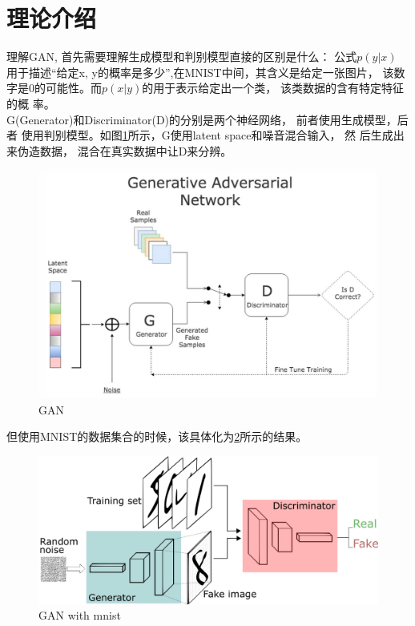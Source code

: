 \section{理论介绍}
理解GAN, 首先需要理解生成模型和判别模型直接的区别是什么：
公式$p(y|x)$ 用于描述“给定x, y的概率是多少”,在MNIST中间，其含义是给定一张图片，
该数字是0的可能性。而$p(x|y)$的用于表示给定出一个类， 该类数据的含有特定特征的概
率。\\
G(Generator)和Discriminator(D)的分别是两个神经网络， 前者使用生成模型，后者
使用判别模型。如图\ref{algorithm}所示，G使用latent space和噪音混合输入， 然
后生成出来伪造数据， 混合在真实数据中让D来分辨。
\begin{figure}[!hbt]
    \includegraphics[width=\linewidth]{pic/algo.jpg}
    \caption{GAN}
    \label{algorithm}
\end{figure}
但使用MNIST的数据集合的时候，该具体化为\ref{m_algorithm}所示的结果。
\begin{figure}[!hbt]
    \includegraphics[width=\linewidth]{pic/mnist_algo.png}
    \caption{GAN with mnist}
    \label{m_algorithm}
\end{figure}
\newline
